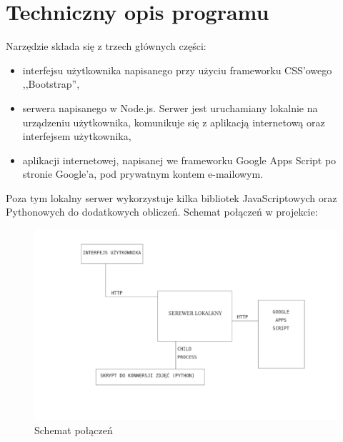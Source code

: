 \chapter{Techniczny opis programu} 
Narzędzie składa się z trzech głównych części:
\begin{itemize}
\item interfejsu użytkownika napisanego przy użyciu frameworku CSS'owego ,,Bootstrap'',
\item serwera napisanego w Node.js. Serwer jest uruchamiany lokalnie na urządzeniu użytkownika, komunikuje się z aplikacją internetową oraz interfejsem użytkownika,
\item aplikacji internetowej, napisanej we frameworku Google Apps Script po stronie Google'a, pod prywatnym kontem e-mailowym.


\end{itemize}
Poza tym lokalny serwer wykorzystuje kilka bibliotek JavaScriptowych oraz Pythonowych do dodatkowych obliczeń. Schemat połączeń w projekcie:
\begin{figure}[H]
  \includegraphics{schemat.png}
  \caption{Schemat połączeń}
  \label{fig:1}
\end{figure}
